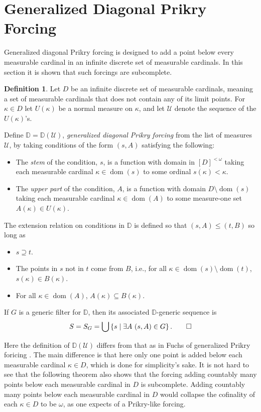 \documentclass{amsart}
\theoremstyle{definition}
\newtheorem{definition}[theorem]{Definition}
\theoremstyle{remark}
\newcommand{\D}{\mathbb{D}}
\newcommand{\U}{\mathcal{U}}
\DeclareMathOperator{\dom}{dom}
\newcommand{\st}{\; | \;}
\newcommand{\set}[2]{\left\{#1\st #2 \right\}}
\begin{document}
\section{Generalized Diagonal Prikry Forcing}
\label{sec:GenDiagonalPrikryForcing}
Generalized diagonal Prikry forcing is designed to add a point below every measurable cardinal in an infinite discrete set of measurable cardinals. In this section it is shown that such forcings are subcomplete.
\begin{definition}
Let $D$ be an infinite discrete set of measurable cardinals, meaning a set of measurable cardinals that does not contain any of its limit points. For $\kappa \in D$ let $U(\kappa)$ be a normal measure on $\kappa$, and let $\U$ denote the sequence of the $U(\kappa)$'s.

Define $\D=\D(\U)$, \emph{generalized diagonal Prikry forcing} from the list of measures $\U$, by taking conditions of the form  
$( s, A )$ satisfying the following:
\begin{itemize}
	\item The \textit{stem} of the condition, $s$, is a function with domain in $[D]^{<\omega}$ taking each measurable cardinal $\kappa \in \dom(s)$ to some ordinal $s(\kappa) < \kappa$.
	\item The \textit{upper part} of the condition, $A$, is a function with domain $D \setminus {\dom(s)}$ taking each measurable cardinal $\kappa \in \dom(A)$ to some measure-one set $A(\kappa) \in U(\kappa)$.
\end{itemize}
The extension relation on conditions in $\D$ is defined so that $( s, A ) \leq ( t, B )$ so long as 
\begin{itemize}
	\item $s \supseteq t$.
	\item The points in $s$ not in $t$ come from $B$, i.e., for all $\kappa \in \dom(s) \setminus \dom(t)$, $s(\kappa) \in B(\kappa)$.
	\item For all $\kappa \in \dom(A)$, $A(\kappa) \subseteq B(\kappa)$.
\end{itemize}
If $G$ is a generic filter for $\D$, then its associated $\D$-generic sequence is \[S = S_G = \bigcup \set{ s }{ \exists A \ ( s, A ) \in G }.\qedhere\]
\end{definition}

Here the definition of $\D(\U)$ differs from that as in Fuchs of generalized Prikry foricing \cite{Fuchs:2005kx}. The main difference is that here only one point is added below each measurable cardinal $\kappa \in D$, which is done for simplicity's sake. It is not hard to see that the following theorem also shows that the forcing adding countably many points below each measurable cardinal in $D$ is subcomplete. Adding countably many points below each measurable cardinal in $D$ would collapse the cofinality of each $\kappa \in D$ to be $\omega$, as one expects of a Prikry-like forcing. %
\end{document}
